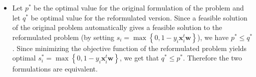 \documentclass{article}
\begin{document}
   \begin{itemize}
       \item Let $p^{*}$ be the optimal
           value for the original formulation of the problem
           and let $q^{*}$ be optimal value
           for the reformulated version.
           Since a feasible solution of the
           original problem automatically gives
           a feasible solution to the
           reformulated problem (by setting
           $s_{i} = \max\left\{0, 1 - y_{i}\mathbf{x}_{i}^{t}\mathbf{w}\right\}$),
           we have $p^{*} \leq q^{*}$.
           Since minimizing the objective function 
           of the reformulated problem yields
           optimal $s_{i}^{*} = \max\left\{0, 1 - y_{i} \mathbf{x}_{i}^{t} \mathbf{w}\right\}$,
           we get that $q^{*} \leq p^{*}$.
           Therefore the two formulations are equivalent.


\end{itemize}
\end{document}
